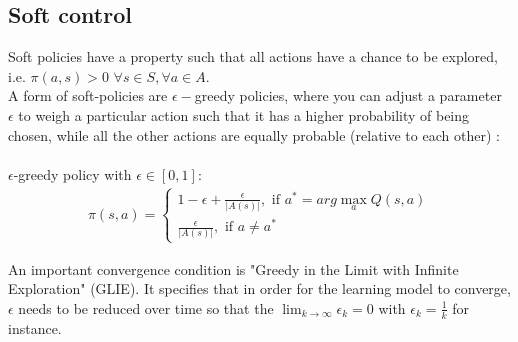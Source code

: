 \subsection{Soft control}

Soft policies have a property such that all actions have a chance to be explored, i.e. $\pi(a, s) > 0$ $\forall s \in S, \forall a \in A.$\\

A form of soft-policies are $\epsilon-$greedy policies, where 
you can adjust a parameter $\epsilon$ to weigh a particular action such that it has a higher probability of being chosen,
while all the other actions are equally probable (relative to each other) \cite{lecture_mfc}:\\\\
$\epsilon$-greedy policy with $\epsilon \in [0, 1]$:
\begin{align}
    \pi(s, a) = \begin{cases} 
        1 - \epsilon + \frac{\epsilon}{|A(s)|}, \text{ if } a^{*} = arg \max_{a} Q(s, a) \\
        \frac{\epsilon}{|A(s)|}, \text{ if }  a \neq a^*
    \end{cases}   
\end{align}

An important convergence condition is "Greedy in the
Limit with Infinite Exploration" \cite{lecture_mfc} 
(GLIE). It specifies that in order for the learning model
to converge, $\epsilon$ needs to be reduced over time 
so that the $\lim_{k \to \infty} \epsilon_{k} = 0$ with $\epsilon_{k} = \frac{1}{k}$ for instance.




